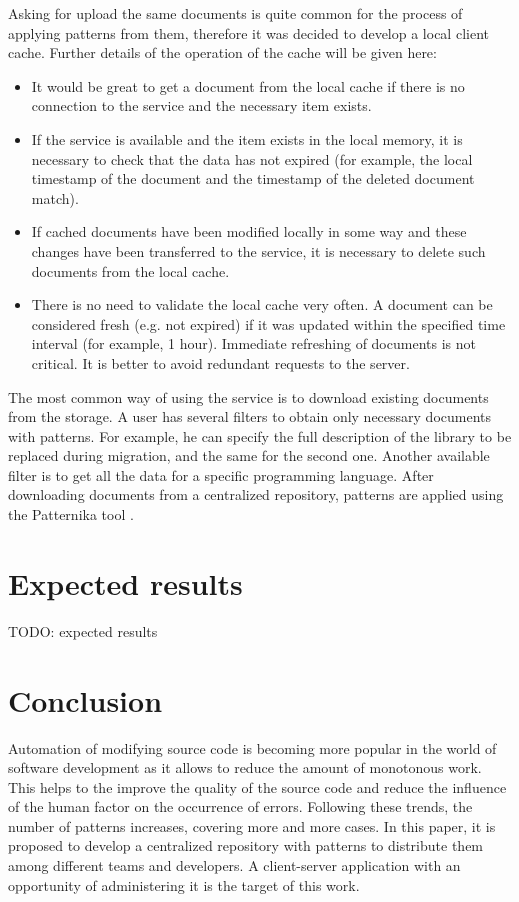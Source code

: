 \documentclass[letterpaper, 10 pt, conference]{ieeeconf}  %
\begin{document}
Asking for upload the same documents is quite common for the process
of applying patterns from them, therefore it was decided to develop a
local client cache. Further details of the operation of the cache will
be given here:
\begin{itemize}
    \item It would be great to get a document from the
local cache if there is no connection to the service and the necessary
item exists.
    \item If the service is available and the item exists in the
local memory, it is necessary to check that the data has not expired
(for example, the local timestamp of the document and the timestamp of
the deleted document match).
    \item If cached documents have been modified locally in some way
and these changes have been transferred to the service, it is
necessary to delete such documents from the local cache.
    \item There is no need to validate the local cache very often. A
document can be considered fresh (e.g. not expired) if it was
updated within the specified time interval (for example, 1 hour).
Immediate refreshing of documents is not critical. It is better to
avoid redundant requests to the server.
\end{itemize}

The most common way of using the service is to download existing
documents from the storage. A user has several filters to obtain only
necessary documents with patterns. For example, he can specify the
full description of the library to be replaced during migration, and
the same for the second one. Another available filter is to get all
the data for a specific programming language. After downloading
documents from a centralized repository, patterns are applied using
the Patternika tool \cite{c1}. 

\section{Expected results}

TODO: expected results

\section{Conclusion}

Automation of modifying source code is becoming more popular
in the world of software development as it allows to reduce the amount
of monotonous work. This helps to the improve the quality of the source
code and reduce the influence of the human factor on the occurrence of
errors. Following these trends, the number of patterns increases, covering
more and more cases. In this paper, it is proposed to develop a
centralized repository with patterns to distribute them among different
teams and developers. A client-server application with an opportunity of administering it is the target of this work.
\end{document}
